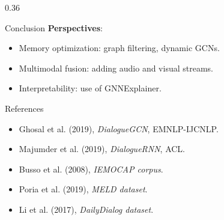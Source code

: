 \documentclass[final]{beamer}
\begin{document}
\begin{frame}[t]
\begin{columns}[t,totalwidth=\textwidth]
\begin{column}{0.36\textwidth}
\begin{block}{Conclusion}
      \vspace{0.5em}
      \textbf{Perspectives}:
      \begin{itemize}
          \item Memory optimization: graph filtering, dynamic GCNs.
          \item Multimodal fusion: adding audio and visual streams.
          \item Interpretability: use of GNNExplainer.
      \end{itemize}
    \end{block}

    \begin{block}{References}
      \footnotesize
      \begin{itemize}
        \item Ghosal et al. (2019), \textit{DialogueGCN}, EMNLP-IJCNLP.
        \item Majumder et al. (2019), \textit{DialogueRNN}, ACL.
        \item Busso et al. (2008), \textit{IEMOCAP corpus}.
        \item Poria et al. (2019), \textit{MELD dataset}.
        \item Li et al. (2017), \textit{DailyDialog dataset}.
      \end{itemize}
    \end{block}
  \end{column}

\end{columns}
\end{frame}
\end{document}
